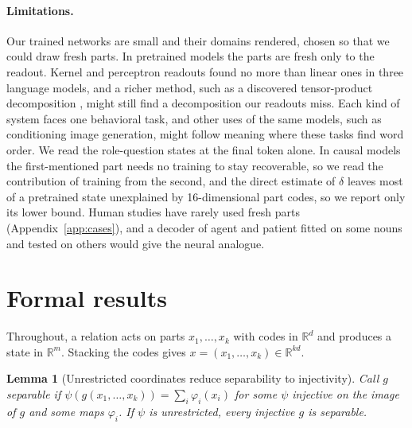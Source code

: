\documentclass[10pt]{article}
\theoremstyle{plain}
\newtheorem{lemma}{Lemma}
\theoremstyle{remark}
\newcommand{\R}{\mathbb{R}}
\begin{document}
\paragraph{Limitations.} Our trained networks are small and their domains rendered, chosen so that we could draw fresh parts. In pretrained models the parts are fresh only to the readout. Kernel and perceptron readouts found no more than linear ones in three language models, and a richer method, such as a discovered tensor-product decomposition \citep{soulos2020}, might still find a decomposition our readouts miss. Each kind of system faces one behavioral task, and other uses of the same models, such as conditioning image generation, might follow meaning where these tasks find word order. We read the role-question states at the final token alone. In causal models the first-mentioned part needs no training to stay recoverable, so we read the contribution of training from the second, and the direct estimate of $\delta$ leaves most of a pretrained state unexplained by 16-dimensional part codes, so we report only its lower bound. Human studies have rarely used fresh parts (Appendix~\ref{app:cases}), and a decoder of agent and patient \citep{frankland2015} fitted on some nouns and tested on others would give the neural analogue.

\FloatBarrier



\clearpage
\appendix
\makeatletter\let\@fb@secFB\relax\makeatother %

\section{Formal results}
\label{app:proofs}

Throughout, a relation acts on parts $x_1, \ldots, x_k$ with codes in $\R^d$ and produces a state in $\R^m$. Stacking the codes gives $x = (x_1, \ldots, x_k) \in \R^{kd}$.



\begin{lemma}[Unrestricted coordinates reduce separability to injectivity]
\label{lem:psi}
Call $g$ separable if $\psi(g(x_1, \ldots, x_k)) = \sum_i \varphi_i(x_i)$ for some $\psi$ injective on the image of $g$ and some maps $\varphi_i$. If $\psi$ is unrestricted, every injective $g$ is separable.
\end{lemma}
\end{document}
